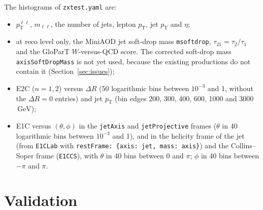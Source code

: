 \documentclass[11pt]{article}
\newcommand{\pt}{p_{\mathrm{T}}}
\newcommand{\GeV}{\ensuremath{\,\mathrm{GeV}}}
\newcommand{\ptll}{\pt^{\ell\ell}}
\newcommand{\code}[1]{\texttt{#1}}
\begin{document}
The histograms of \code{zxtest.yaml} are:
\begin{itemize}
\item $\ptll$, $m_{\ell\ell}$, the number of jets, lepton $\pt$, jet $\pt$ and $\eta$;
\item at reco level only, the MiniAOD jet soft-drop mass \code{msoftdrop}, $\tau_{21} = \tau_2/\tau_1$ and the GloParT
  $W$-versus-QCD score. The corrected soft-drop mass \code{axisSoftDropMass} is not yet used, because the existing
  productions do not contain it (Section~\ref{sec:issues});
\item E2C ($n = 1, 2$) versus $\Delta R$ (50 logarithmic bins between $10^{-3}$ and 1, without the $\Delta R = 0$
  entries) and jet $\pt$ (bin edges 200, 300, 400, 600, 1000 and 3000\GeV);
\item E1C versus $(\theta, \phi)$ in the \code{jetAxis} and \code{jetProjective} frames ($\theta$ in 40 logarithmic bins
  between $10^{-3}$ and 1), and in the helicity frame of the jet (from \code{E1CLab} with
  \code{restFrame: \{axis: jet, mass: axis\}}) and the Collins--Soper frame (\code{E1CCS}), with $\theta$ in 40 bins
  between 0 and $\pi$; $\phi$ in 40 bins between $-\pi$ and $\pi$.
\end{itemize}

\section{Validation}
\label{sec:validation}
\end{document}
